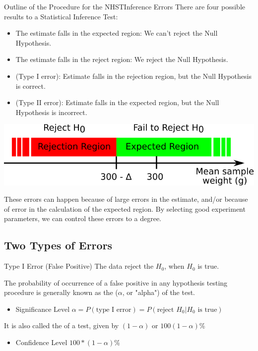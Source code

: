 \begin{frame}{Outline of the Procedure for the NHST}{Inference Errors}
  There are four possible results to a Statistical Inference Test:
  \begin{itemize}
    \item The estimate falls in the expected region: We can't reject the Null Hypothesis.
    \item The estimate falls in the reject region: We reject the Null Hypothesis.
    \item (Type I error): Estimate falls in the rejection region, but the Null Hypothesis is correct.
    \item (Type II error): Estimate falls in the expected region, but the Null Hypothesis is incorrect.
  \end{itemize}

  \begin{center}
    \includegraphics[width=.5\textwidth]{../img/critical_region}
  \end{center}

  These errors can happen because of large errors in the estimate, and/or because of error in the calculation of the expected region. By selecting good experiment parameters, we can control these errors to a degree.

\end{frame}

\subsection{Two Types of Errors}

\begin{frame}[t]{Type I Error (False Positive)}
{The data reject the $H_0$, when $H_0$ is true.}

  The probability of occurrence of a false positive in any hypothesis testing procedure is generally known as the  ($\alpha$, or "alpha") of the test.\bigskip
    \begin{itemize}
      \item Significance Level $\alpha = P(\text{type I error}) = P(\text{reject }H_0|H_0\text{ is true})$
    \end{itemize}\vfill

  It is also called the  of a test, given by $(1-\alpha)$ or $100(1-\alpha)$\%\bigskip

  \begin{itemize}
    \item Confidence Level $100*(1-\alpha)$\%
  \end{itemize}
\end{frame}

